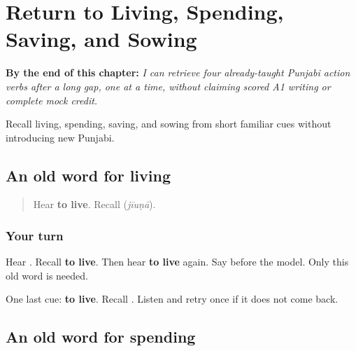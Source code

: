 
\chapter{Return to Living, Spending, Saving, and Sowing}
\label{ch:pa-four-familiar-actions-r4}

\begin{chapteropening}
\textbf{By the end of this chapter:} \emph{I can retrieve four already-taught Punjabi action verbs after a long gap, one at a time, without claiming scored A1 writing or complete mock credit.}

Recall living, spending, saving, and sowing from short familiar cues without introducing new Punjabi.
\end{chapteropening}

\section[\texorpdfstring{\pa{ਜੀਉਣਾ} (jīuṇā)}{ਜੀਉਣਾ (jīuṇā)}]{An old word for living}

\label{lesson:PA-R165-live-again}



\begin{quote}
Hear \textbf{to live}. Recall \textbf{} (\emph{jīuṇā}).
\end{quote}

\subsection*{Your turn}
Hear \textbf{}. Recall \textbf{to live}. Then hear \textbf{to live} again. Say \textbf{} before the model. Only this old word is needed.

\begin{tcolorbox}[breakable,colback=teal!4,colframe=teal!35!black,title={Before you move on}]
One last cue: \textbf{to live}. Recall \textbf{}. Listen and retry once if it does not come back.
\end{tcolorbox}
\section[\texorpdfstring{\pa{ਖ਼ਰਚਣਾ} (kharcṇā)}{ਖ਼ਰਚਣਾ (kharcṇā)}]{An old word for spending}

